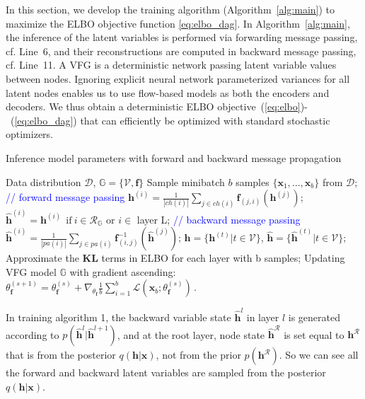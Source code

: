 \documentclass[sigconf, anonymous, review]{acmart}
\theoremstyle{plain}
\theoremstyle{definition}
\theoremstyle{remark}
\begin{document}
In this section, we develop the training algorithm (Algorithm~\ref{alg:main}) to  maximize  the ELBO objective function \eqref{eq:elbo_dag}.
In Algorithm~\ref{alg:main}, the inference of the latent variables is performed via forwarding message passing, cf. Line~6, and their reconstructions are computed in backward message passing, cf. Line~11.
A VFG is a deterministic network passing latent variable values between nodes. Ignoring explicit neural network parameterized variances for all latent nodes enables us to use flow-based models as both the encoders and decoders. 
We thus obtain a deterministic ELBO objective~(\ref{eq:elbo})-~(\ref{eq:elbo_dag}) that can efficiently be optimized with standard stochastic optimizers. 
\begin{algorithm}[h]
   \caption{Inference model parameters with  forward and backward message propagation}
   \label{alg:main}
\begin{algorithmic}[1]
    Data distribution $\mathcal{D}$,  $\mathbb{G} = \{\mathcal{V}, \mathbf{f}\}$
   \STATE  Sample minibatch $b$ samples $\{\mathbf{x}_1, ..., \mathbf{x}_b \}$ from $\mathcal{D}$;
   \label{line:for2}
    \STATE  \textcolor{blue}{// forward message passing}
   \STATE $\mathbf{h}^{(i)} = \frac{1}{|ch(i)|} \sum_{j \in ch(i) } \mathbf{f}_{(j,i)}(\mathbf{h}^{(j)})$; \label{line:forward} 
    \ENDFOR
    \STATE $\widehat{\mathbf{h}}^{(i)} = \mathbf{h}^{(i)} \ \  \text{if} \ i \in \mathcal{R}_{\mathbb{G}} $ or $i \in$ layer L;
   \STATE \textcolor{blue}{// backward message passing}
   \STATE $\widehat{\mathbf{h}}^{(i)} = \frac{1}{|pa(i)|} \sum_{j \in pa(i) } \mathbf{f}^{-1}_{ (i,j)}(\widehat{\mathbf{h}}^{(j)}) $;\label{line:backward}  
   \ENDFOR
    \STATE  $\mathbf{h} =  \{\mathbf{h}^{(t)} \big |  t \in \mathcal{V} \}$, $\widehat{\mathbf{h}} =  \{\widehat{\mathbf{h}}^{(t)} \big | t \in \mathcal{V} \}$;
    \STATE Approximate the $\mathbf{KL}$ terms in ELBO for each layer with b samples;
    \STATE Updating VFG model $\mathbb{G}$ with gradient ascending: $\theta^{(s+1)}_{\mathbf{f}} = \theta^{(s)}_{\mathbf{f}} + \nabla_{\theta_{\mathbf{f}}}\frac{1}{b} \sum_{i=1}^b  \mathcal{L}(\mathbf{x}_b; \theta^{(s)}_{\mathbf{f}})   \, .$\label{line:update} 
   \ENDFOR
\end{algorithmic}
\end{algorithm}

In training algorithm 1, the backward variable state $\widehat{\mathbf{h}}^l$ in  layer $l$  is generated according to $p(\widehat{\mathbf{h}}^l | \widehat{\mathbf{h}}^{l+1})$, and at the root  layer,  node state $\widehat{\mathbf{h}}^{\mathcal{R}}$ is set  equal to  $\mathbf{h}^{\mathcal{R}}$ that is
from  the posterior $q(\mathbf{h}|\mathbf{x})$, not from the prior $p(\mathbf{h}^{\mathcal{R}})$. So we can see all the forward and backward latent variables are sampled from the posterior $q(\mathbf{h}|\mathbf{x})$. 
\end{document}
